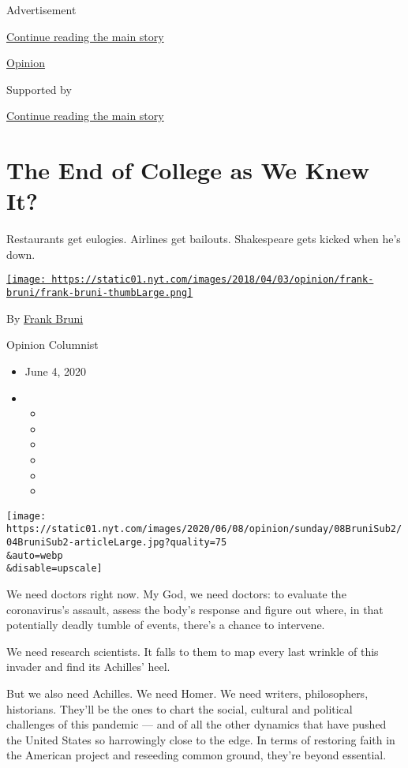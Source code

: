 Advertisement

\protect\hyperlink{after-top}{Continue reading the main story}

\href{/section/opinion}{Opinion}

Supported by

\protect\hyperlink{after-sponsor}{Continue reading the main story}

\hypertarget{the-end-of-college-as-we-knew-it}{%
\section{The End of College as We Knew
It?}\label{the-end-of-college-as-we-knew-it}}

Restaurants get eulogies. Airlines get bailouts. Shakespeare gets kicked
when he's down.

\href{https://www.nytimes.com/by/frank-bruni}{\texttt{[image: https://static01.nyt.com/images/2018/04/03/opinion/frank-bruni/frank-bruni-thumbLarge.png]}}

By \href{https://www.nytimes.com/by/frank-bruni}{Frank Bruni}

Opinion Columnist

\begin{itemize}
\item
  June 4, 2020
\item
  \begin{itemize}
  \item
  \item
  \item
  \item
  \item
  \item
  \end{itemize}
\end{itemize}

\texttt{[image: https://static01.nyt.com/images/2020/06/08/opinion/sunday/08BruniSub2/04BruniSub2-articleLarge.jpg?quality=75\\\&auto=webp\\\&disable=upscale]}

We need doctors right now. My God, we need doctors: to evaluate the
coronavirus's assault, assess the body's response and figure out where,
in that potentially deadly tumble of events, there's a chance to
intervene.

We need research scientists. It falls to them to map every last wrinkle
of this invader and find its Achilles' heel.

But we also need Achilles. We need Homer. We need writers, philosophers,
historians. They'll be the ones to chart the social, cultural and
political challenges of this pandemic --- and of all the other dynamics
that have pushed the United States so harrowingly close to the edge. In
terms of restoring faith in the American project and reseeding common
ground, they're beyond essential.

